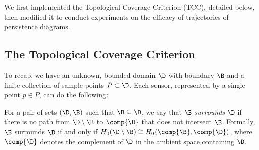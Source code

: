 
We first implemented the Topological Coverage Criterion (TCC), detailed below, then modified it to conduct experiments on the efficacy of trajectories of persistence diagrams.

\subsection{The Topological Coverage Criterion}

To recap, we have an unknown, bounded domain $\D$ with boundary $\B$ and a finite collection of sample points $P\subset\D$.
Each sensor, represented by a single point $p\in P$, can do the following:

\vspace{3ex}
\begin{center}
\setlength{\fboxsep}{2ex}
\end{center}\vspace{3ex}

\begin{definition}
    For a pair of sets $(\D, \B)$ such that $\B\subseteq \D$, we say that $\B$ \emph{surrounds} $\D$ if there is no path from $\D\setminus\B$ to $\comp{\D}$ that does not intersect $\B$.
    Formally, $\B$ surrounds $\D$ if and only if $H_0(\D\setminus \B) \cong H_0(\comp{\B}, \comp{\D})$, where $\comp{\D}$ denotes the complement of $\D$ in the ambient space containing $\D$.
\end{definition}

